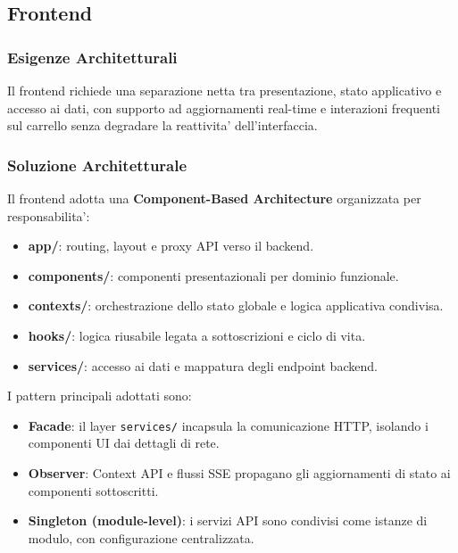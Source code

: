 \documentclass[a4paper, 11pt, oneside]{scrartcl}
\begin{document}
\subsection{Frontend}

\subsubsection{Esigenze Architetturali}
Il frontend richiede una separazione netta tra presentazione, stato applicativo e accesso ai dati, con supporto ad aggiornamenti real-time e interazioni frequenti sul carrello senza degradare la reattivita' dell'interfaccia.

\subsubsection{Soluzione Architetturale}
Il frontend adotta una \textbf{Component-Based Architecture} organizzata per responsabilita':
\begin{itemize}
    \item \textbf{app/}: routing, layout e proxy API verso il backend.
    \item \textbf{components/}: componenti presentazionali per dominio funzionale.
    \item \textbf{contexts/}: orchestrazione dello stato globale e logica applicativa condivisa.
    \item \textbf{hooks/}: logica riusabile legata a sottoscrizioni e ciclo di vita.
    \item \textbf{services/}: accesso ai dati e mappatura degli endpoint backend.
\end{itemize}

I pattern principali adottati sono:
\begin{itemize}
    \item \textbf{Facade}: il layer \texttt{services/} incapsula la comunicazione HTTP, isolando i componenti UI dai dettagli di rete.
    \item \textbf{Observer}: Context API e flussi SSE propagano gli aggiornamenti di stato ai componenti sottoscritti.
    \item \textbf{Singleton (module-level)}: i servizi API sono condivisi come istanze di modulo, con configurazione centralizzata.
\end{itemize}
\end{document}
